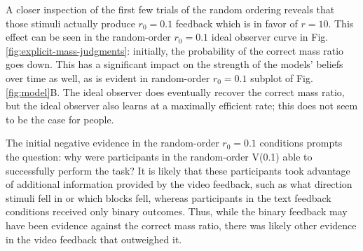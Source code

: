 \documentclass[10pt,letterpaper]{article}
\newcommand{\rlow}[0]{$r_0=0.1$}
\newcommand{\rhigh}[0]{$r_0=10$}
\newcommand{\vfblow}[0]{V(0.1)}
\newcommand{\vfb}[0]{video feedback}
\newcommand{\fbhigh}[0]{B(10)}
\newcommand{\rand}[1]{random-order #1}
\newcommand{\diag}[1]{diagnostic-order #1}
\begin{document}

A closer inspection of the first few trials of the random ordering
reveals that those stimuli actually produce \rlow{} feedback which is
in favor of $r=10$. This effect can be seen in the \rand{\rlow{}}
ideal observer curve in Fig. \ref{fig:explicit-mass-judgments}:
initially, the probability of the correct mass ratio goes down. This
has a significant impact on the strength of the models' beliefs over
time as well, as is evident in \rand{\rlow{}} subplot of Fig.
\ref{fig:model}B. The ideal observer does eventually recover the
correct mass ratio, but the ideal observer also learns at a maximally
efficient rate; this does not seem to be the case for people.


The initial negative evidence in the \rand{\rlow{}} conditions prompts
the question: why were participants in the \rand{\vfblow{}} able to
successfully perform the task? It is likely that these participants
took advantage of additional information provided by the video
feedback, such as what direction stimuli fell in or which blocks fell,
whereas participants in the text feedback conditions received only
binary outcomes. Thus, while the binary feedback may have been
evidence against the correct mass ratio, there was likely other
evidence in the video feedback that outweighed it.

\end{document}
